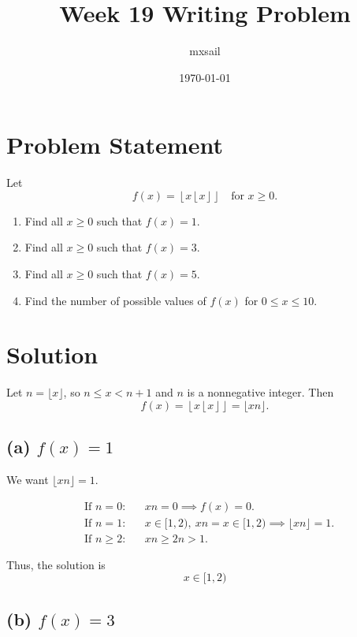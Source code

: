 \documentclass{article}
\title{Week 19 Writing Problem}
\author{mxsail}
\date{\today}
\begin{document}
\maketitle

\section*{Problem Statement}

Let
\[
f(x) = \left\lfloor x \left\lfloor x \right\rfloor \right\rfloor \quad \text{for } x \ge 0.
\]

\begin{enumerate}[label=(\alph*)]
    \item Find all $x \ge 0$ such that $f(x) = 1$.
    \item Find all $x \ge 0$ such that $f(x) = 3$.
    \item Find all $x \ge 0$ such that $f(x) = 5$.
    \item Find the number of possible values of $f(x)$ for $0 \le x \le 10$.
\end{enumerate}

\section*{Solution}

Let $n = \lfloor x \rfloor$, so $n \le x < n+1$ and $n$ is a nonnegative integer. Then
\[
f(x) = \left\lfloor x \left\lfloor x \right\rfloor \right\rfloor = \lfloor x n \rfloor.
\]

\subsection*{(a) $f(x) = 1$}

We want $\lfloor x n \rfloor = 1$.

\begin{align*}
&\text{If } n = 0: && x n = 0 \implies f(x) = 0. \\
&\text{If } n = 1: && x \in [1,2),\ x n = x \in [1,2) \implies \lfloor x n \rfloor = 1. \\
&\text{If } n \ge 2: && x n \ge 2n > 1.
\end{align*}

Thus, the solution is
\[
\boxed{x \in [1,2)}
\]

\subsection*{(b) $f(x) = 3$}
\end{document}
